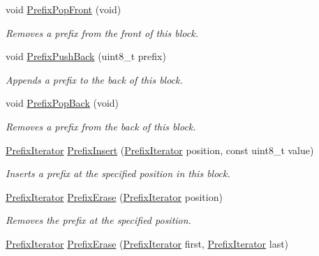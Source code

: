 \begin{DoxyCompactItemize}
void \hyperlink{classns3_1_1PbbAddressBlock_a905feb881cbdb50f62abb4dcd3826998}{Prefix\+Pop\+Front} (void)
\begin{DoxyCompactList}\small\item\em Removes a prefix from the front of this block. \end{DoxyCompactList}\item 
void \hyperlink{classns3_1_1PbbAddressBlock_a8e6f539ccffd043a2890396d882d0a42}{Prefix\+Push\+Back} (uint8\+\_\+t prefix)
\begin{DoxyCompactList}\small\item\em Appends a prefix to the back of this block. \end{DoxyCompactList}\item 
void \hyperlink{classns3_1_1PbbAddressBlock_aaf3441536abef9fe6d3eb49d1f6374e5}{Prefix\+Pop\+Back} (void)
\begin{DoxyCompactList}\small\item\em Removes a prefix from the back of this block. \end{DoxyCompactList}\item 
\hyperlink{classns3_1_1PbbAddressBlock_a0c36abcfa36790bcbd156d036e103fa4}{Prefix\+Iterator} \hyperlink{classns3_1_1PbbAddressBlock_aadf8bd151279186cc12cd1004c30eee5}{Prefix\+Insert} (\hyperlink{classns3_1_1PbbAddressBlock_a0c36abcfa36790bcbd156d036e103fa4}{Prefix\+Iterator} position, const uint8\+\_\+t value)
\begin{DoxyCompactList}\small\item\em Inserts a prefix at the specified position in this block. \end{DoxyCompactList}\item 
\hyperlink{classns3_1_1PbbAddressBlock_a0c36abcfa36790bcbd156d036e103fa4}{Prefix\+Iterator} \hyperlink{classns3_1_1PbbAddressBlock_aa6249a80c3d048ebcdc53b6b675a324d}{Prefix\+Erase} (\hyperlink{classns3_1_1PbbAddressBlock_a0c36abcfa36790bcbd156d036e103fa4}{Prefix\+Iterator} position)
\begin{DoxyCompactList}\small\item\em Removes the prefix at the specified position. \end{DoxyCompactList}\item 
\hyperlink{classns3_1_1PbbAddressBlock_a0c36abcfa36790bcbd156d036e103fa4}{Prefix\+Iterator} \hyperlink{classns3_1_1PbbAddressBlock_ad6e17e9b5c2df2f3ae7eea0257b5dc9b}{Prefix\+Erase} (\hyperlink{classns3_1_1PbbAddressBlock_a0c36abcfa36790bcbd156d036e103fa4}{Prefix\+Iterator} first, \hyperlink{classns3_1_1PbbAddressBlock_a0c36abcfa36790bcbd156d036e103fa4}{Prefix\+Iterator} last)

\end{DoxyCompactItemize}
